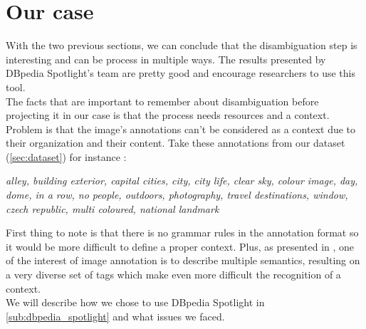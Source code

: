 \section{Our case} %
\label{sec:our_case}
With the two previous sections, we can conclude that the disambiguation step is interesting and can be process in multiple ways. The results presented by DBpedia Spotlight's team are pretty good and encourage researchers to use this tool.\\
The facts that are important to remember about disambiguation before projecting it in our case is that the process needs resources and a context. Problem is that the image's annotations can't be considered as a context due to their organization and their content. Take these annotations from our dataset (\ref{sec:dataset}) for instance :
\begin{center}
	\textit{alley, building exterior, capital cities, city, city life, clear sky, colour image, day, dome, in a row, no people, outdoors, photography, travel destinations, window, czech republic, multi coloured, national landmark}
\end{center}
First thing to note is that there is no grammar rules in the annotation format so it would be more difficult to define a proper context. Plus, as presented in \cite{qian2014social}, one of the interest of image annotation is to describe multiple semantics, resulting on a very diverse set of tags which make even more difficult the recognition of a context.\\
We will describe how we chose to use DBpedia Spotlight in \ref{sub:dbpedia_spotlight} and what issues we faced. 
